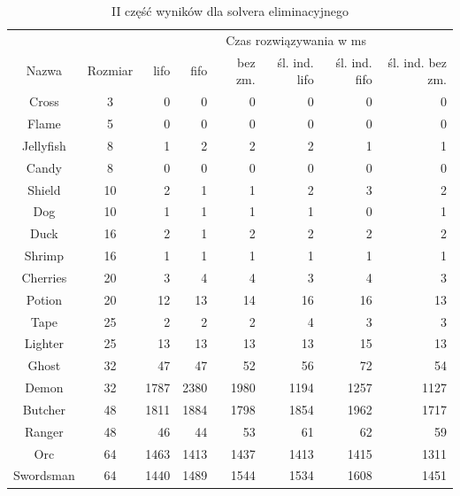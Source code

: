 \begin{table}[h]
    \begin{center}
        \begin{tabular}{|c|c|r r r r r r|}
            \hline
            {}          & {}        & \multicolumn{6}{c|}{Czas rozwiązywania w ms} \\
            Nazwa       & Rozmiar   & lifo & fifo & bez zm. & śl. ind. lifo & śl. ind. fifo & śl. ind. bez zm. \\
            \hline
            Cross       & 3         & 0     & 0     & 0     & 0     & 0     & 0     \\
            Flame       & 5         & 0     & 0     & 0     & 0     & 0     & 0     \\
            Jellyfish   & 8         & 1     & 2     & 2     & 2     & 1     & 1     \\
            Candy       & 8         & 0     & 0     & 0     & 0     & 0     & 0     \\
            Shield      & 10        & 2     & 1     & 1     & 2     & 3     & 2     \\
            Dog         & 10        & 1     & 1     & 1     & 1     & 0     & 1     \\
            Duck        & 16        & 2     & 1     & 2     & 2     & 2     & 2     \\
            Shrimp      & 16        & 1     & 1     & 1     & 1     & 1     & 1     \\
            Cherries    & 20        & 3     & 4     & 4     & 3     & 4     & 3     \\
            Potion      & 20        & 12    & 13    & 14    & 16    & 16    & 13    \\
            Tape        & 25        & 2     & 2     & 2     & 4     & 3     & 3     \\
            Lighter     & 25        & 13    & 13    & 13    & 13    & 15    & 13    \\
            \hline
            Ghost       & 32        & 47    & 47    & 52    & 56    & 72    & 54    \\
            Demon       & 32        & 1787  & 2380  & 1980  & 1194  & 1257  & 1127  \\
            Butcher     & 48        & 1811  & 1884  & 1798  & 1854  & 1962  & 1717  \\
            Ranger      & 48        & 46    & 44    & 53    & 61    & 62    & 59    \\
            Orc         & 64        & 1463  & 1413  & 1437  & 1413  & 1415  & 1311  \\
            Swordsman   & 64        & 1440  & 1489  & 1544  & 1534  & 1608  & 1451  \\
            \hline
        \end{tabular}
    \end{center}
    \caption{II część wyników dla solvera eliminacyjnego}
\end{table}

